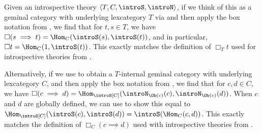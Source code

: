 \begin{observation}
Given an introspective theory $\langle T, C, \introS, \introN \rangle$, if we think of this as a geminal category with underlying lexcategory $T$ via  and then apply the box notation from , we find that for $t, s \in T$, we have $\Box(s \implies t) = \Hom_C(\introS(s), \introS(t))$, and in particular, $\Box t = \Hom_C(1, \introS(t))$. This exactly matches the definition of $\Box_T t$ used for introspective theories from .

Alternatively, if we use  to obtain a $T$-internal geminal category with underlying lexcategory $C$, and then apply the box notation from , we find that for $c, d \in C$, we have $\Box(c \implies d) = \Hom_{\introS[C]}(\introN_{\Ob(c)}(c), \introN_{\Ob(c)}(d))$. When $c$ and $d$ are globally defined, we can use  to show this equal to $\Hom_{\introS[C]}(\introS(c), \introS(d)) =  \introS(\Hom_C(c, d))$. This exactly matches the definition of $\Box_C (c \implies d)$ used with introspective theories from .

\end{observation}

\fileend